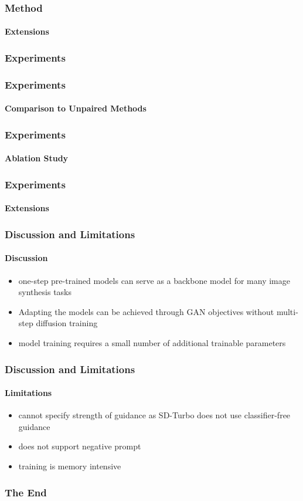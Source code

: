 \documentclass[aspectratio=169, lecture, amberg]{OTHAWbeamer}
\begin{document}
\begin{frame}
\frametitle{Method}
\framesubtitle{Extensions}

\end{frame}

\begin{frame}
\frametitle{Experiments}

\end{frame}

\begin{frame}
\frametitle{Experiments}
\framesubtitle{Comparison to Unpaired Methods}

\end{frame}

\begin{frame}
\frametitle{Experiments}
\framesubtitle{Ablation Study}

\end{frame}

\begin{frame}
\frametitle{Experiments}
\framesubtitle{Extensions}

\end{frame}

\begin{frame}
\frametitle{Discussion and Limitations}
\framesubtitle{Discussion}
\begin{itemize}
    \item one-step pre-trained models can serve as a backbone model for many image synthesis tasks
    \item Adapting the models can be achieved through GAN objectives without multi-step diffusion training
    \item model training requires a small number of additional trainable parameters
\end{itemize}
\end{frame}

\begin{frame}
\frametitle{Discussion and Limitations}
\framesubtitle{Limitations}
\begin{itemize}
    \item cannot specify strength of guidance as SD-Turbo does not use classifier-free guidance
    \item does not support negative prompt
    \item training is memory intensive
\end{itemize}

\end{frame}

\begin{frame}
\frametitle{The End}
\begin{center}
\scalebox{2}{Questions?}
\end{center}
\end{frame}
\end{document}
